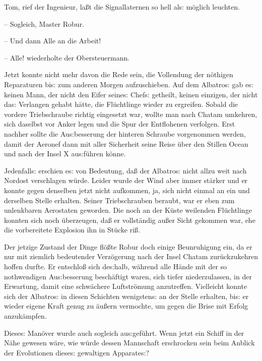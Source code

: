 \documentclass[oneside,12pt]{book}
\newcommand{\s}{s:}
\begin{document}
{\glqq}Tom, rief der Ingenieur, la{\ss}t die Signallaternen so hell
al{\s} m\"oglich leuchten.

-- Sogleich, Master Robur.

-- Und dann Alle an die Arbeit!

-- Alle!{\grqq} wiederholte der Obersteuermann.

Jetzt konnte nicht mehr davon die Rede sein, die Vollendung der
n\"othigen Reparaturen bi{\s} zum anderen Morgen aufzuschieben. Auf
dem {\glqq}Albatro{\s}{\grqq} gab e{\s} keinen Mann, der nicht den
Eifer seine{\s} Chef{\s} getheilt, keinen einzigen, der nicht da{\s}
Verlangen gehabt h\"atte, die Fl\"uchtlinge wieder zu ergreifen.
Sobald die vordere Triebschraube richtig eingesetzt war, wollte man
nach Chatam umkehren, sich daselbst vor Anker legen und die Spur der
Entflohenen verfolgen. Erst nachher sollte die Au{\s}besserung der
hinteren Schraube vorgenommen werden, damit der Aeronef dann mit
aller Sicherheit seine Reise \"uber den Stillen Ocean und nach der
Insel X au{\s}f\"uhren k\"onne.

Jedenfall{\s} erschien e{\s} von Bedeutung, da{\ss} der
{\glqq}Albatro{\s}{\grqq} nicht allzu weit nach Nordost verschlagen
w\"urde. Leider wurde der Wind aber immer st\"arker und er konnte
gegen denselben jetzt nicht aufkommen, ja, sich nicht einmal an ein
und derselben Stelle erhalten. Seiner Triebschrauben beraubt, war er
eben zum unlenkbaren Aerostaten geworden. Die noch an der K\"uste
weilenden Fl\"uchtlinge konnten sich noch \"uberzeugen, da{\ss} er
vollst\"andig au{\ss}er Sicht gekommen war, ehe die vorbereitete
Explosion ihn in St\"ucke ri{\ss}.

Der jetzige Zustand der Dinge fl\"o{\ss}te Robur doch einige
Beunruhigung ein, da er nur mit ziemlich bedeutender Verz\"ogerung
nach der Insel Chatam zur\"uckzukehren hoffen durfte. Er
entschlo{\ss} sich de{\s}halb, w\"ahrend alle H\"ande mit der so
nothwendigen Au{\s}besserung besch\"aftigt waren, sich tiefer
niederzulassen, in der Erwartung, damit eine schw\"achere
Luftstr\"omung anzutreffen. Vielleicht konnte sich der
{\glqq}Albatro{\s}{\grqq} in diesen Schichten wenigsten{\s} an der
Stelle erhalten, bi{\s} er wieder eigene Kraft genug zu \"au{\ss}ern
vermochte, um gegen die Brise mit Erfolg anzuk\"ampfen.

Diese{\s} Man\"over wurde auch sogleich au{\s}gef\"uhrt. Wenn jetzt
ein Schiff in der N\"ahe gewesen w\"are, wie w\"urde dessen
Mannschaft erschrocken sein beim Anblick der Evolutionen diese{\s}
gewaltigen Apparate{\s}?
\end{document}
